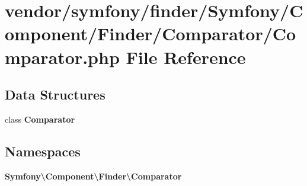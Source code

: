 \section{vendor/symfony/finder/\+Symfony/\+Component/\+Finder/\+Comparator/\+Comparator.php File Reference}
\label{symfony_2finder_2_symfony_2_component_2_finder_2_comparator_2_comparator_8php}
\subsection*{Data Structures}
\begin{DoxyCompactItemize}
\item 
class {\bf Comparator}
\end{DoxyCompactItemize}
\subsection*{Namespaces}
\begin{DoxyCompactItemize}
\item 
 {\bf Symfony\textbackslash{}\+Component\textbackslash{}\+Finder\textbackslash{}\+Comparator}
\end{DoxyCompactItemize}
